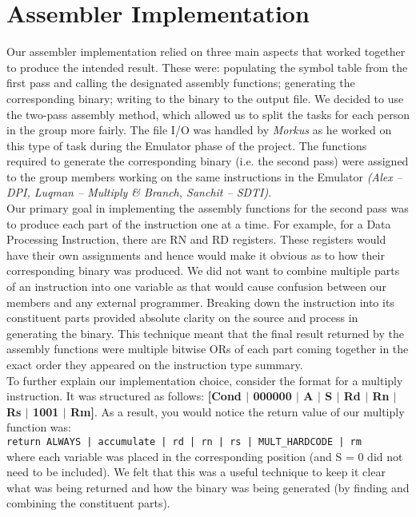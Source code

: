 \documentclass[10pt]{article}
\begin{document}
\section*{Assembler Implementation}

Our assembler implementation relied on three main aspects that worked together to produce the intended result. These were: populating the symbol table from the first pass and calling the designated assembly functions; generating the corresponding binary; writing to the binary to the output file. We decided to use the two-pass assembly method, which allowed us to split the tasks for each person in the group more fairly. The file I/O was handled by {\sl Morkus} as he worked on this type of task during the Emulator phase of the project. The functions required to generate the corresponding binary (i.e. the second pass) were assigned to the group members working on the same instructions in the Emulator {\sl(Alex – DPI, Luqman – Multiply \& Branch, Sanchit – SDTI)}. 
\\

Our primary goal in implementing the assembly functions for the second pass was to produce each part of the instruction one at a time. For example, for a Data Processing Instruction, there are RN and RD registers. These registers would have their own assignments and hence would make it obvious as to how their corresponding binary was produced. We did not want to combine multiple parts of an instruction into one variable as that would cause confusion between our members and any external programmer. Breaking down the instruction into its constituent parts provided absolute clarity on the source and process in generating the binary. This technique meant that the final result returned by the assembly functions were multiple bitwise ORs of each part coming together in the exact order they appeared on the instruction type summary. 
\\

To further explain our implementation choice, consider the format for a multiply instruction. It was structured as follows: \textbf{[Cond $|$ 000000 $|$ A $|$ S $|$ Rd $|$ Rn $|$ Rs $|$ 1001 $|$ Rm]}. As a result, you would notice the return value of our multiply function was:
\\

{\tt return ALWAYS | accumulate | rd | rn | rs | MULT\_HARDCODE | rm}
\\

where each variable was placed in the corresponding position (and S = 0 did not need to be included). We felt that this was a useful technique to keep it clear what was being returned and how the binary was being generated (by finding and combining the constituent parts).
\\
\end{document}

